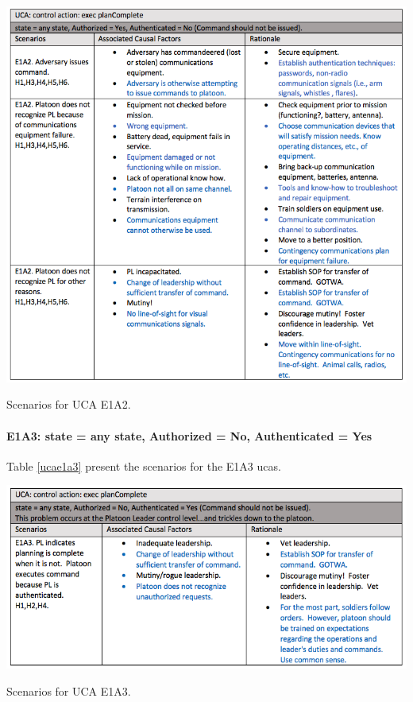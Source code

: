 \documentclass[../../main/main.tex]{subfiles}
\begin{document}
\begin{table}[ht!]
\begin{center}
\includegraphics[width=\linewidth]{../figures/ucae1a2}
\caption{Scenarios for UCA E1A2.}
\label{ucae1a2}
\end{center}
\end{table}
\clearpage

\paragraph*{E1A3: state  = any state, Authorized = No, Authenticated = Yes}
Table \ref{ucae1a3}  present the scenarios for the E1A3 \glspl{uca}.

\begin{table}[ht!]
\begin{center}
\includegraphics[width=\linewidth]{../figures/ucae1a3}
\caption{Scenarios for UCA E1A3.}
\label{ucae1a3}
\end{center}
\end{table}
\end{document}
